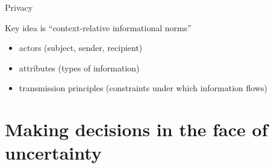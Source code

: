 \documentclass{beamer}
\begin{document}
\begin{frame}{Privacy}

Key idea is ``context-relative informational norms''\\
\begin{itemize}
\item actors (subject, sender, recipient)
\item attributes (types of information)
\item transmission principles (constraints under which information flows)
\end{itemize}

\end{frame}
\section{Making decisions in the face of uncertainty}
\end{document}
